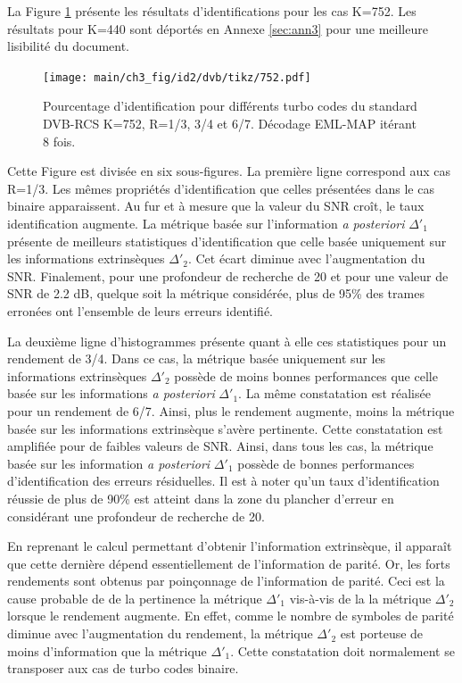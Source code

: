 La Figure \ref{fig:dvb752} présente les résultats d'identifications pour les cas K=752. Les résultats pour K=440 sont 
déportés en Annexe \ref{sec:ann3} pour une meilleure lisibilité du document.
\begin{figure}[!h]
	\centering
	\hspace*{-1cm}
	\texttt{[image: main/ch3\_fig/id2/dvb/tikz/752.pdf]}
	\caption{Pourcentage d'identification pour différents turbo codes du standard DVB-RCS K=752, R=1/3, 3/4 et 6/7.
	Décodage EML-MAP itérant 8 fois. \label{fig:dvb752}}
\end{figure}
Cette Figure est divisée en six sous-figures. La première ligne correspond aux cas R=1/3. Les mêmes propriétés 
d'identification que celles présentées dans le cas binaire apparaissent. Au fur et à mesure que la valeur du SNR croît, le 
taux identification augmente. La métrique basée sur l'information \textit{a posteriori} $\Delta'_1$ présente de meilleurs statistiques
d'identification que celle basée uniquement sur les informations extrinsèques $\Delta'_2$. Cet écart diminue avec l'augmentation du SNR.
Finalement, pour une profondeur de recherche de 20 et pour une valeur de SNR de 2.2 dB, quelque soit la métrique considérée, 
plus de 95\% des trames erronées ont l'ensemble de leurs erreurs identifié.

La deuxième ligne d'histogrammes présente quant à elle ces statistiques  pour un rendement de 3/4. Dans ce cas, la 
métrique basée uniquement sur les informations extrinsèques $\Delta'_2$ possède de moins bonnes performances que celle basée sur les 
informations \textit{a posteriori} $\Delta'_1$. La même constatation est réalisée pour un rendement de 6/7. Ainsi, plus le rendement 
augmente, moins la métrique basée sur les informations extrinsèque s'avère pertinente. Cette constatation est amplifiée pour 
de faibles valeurs de SNR. Ainsi, dans tous les cas, la métrique basée sur les information \textit{a posteriori} $\Delta'_1$
possède de bonnes performances d'identification des erreurs résiduelles. Il est à noter qu'un taux d'identification réussie de plus de 
90\% est atteint dans la zone du plancher d'erreur en considérant une profondeur de recherche de 20. 

En reprenant le calcul permettant d'obtenir l'information extrinsèque, il apparaît que cette dernière dépend 
essentiellement de l'information de parité. Or, les forts rendements sont obtenus par poinçonnage 
de l'information de parité. Ceci est la cause probable de de la pertinence la métrique $\Delta'_1$ vis-à-vis de la
la métrique $\Delta'_2$ lorsque le rendement augmente. En effet, comme le nombre de symboles de parité diminue avec l'augmentation 
du rendement, la métrique $\Delta'_2$ est porteuse de moins d'information que la métrique $\Delta'_1$. Cette constatation 
doit normalement se transposer aux cas de turbo codes binaire.

